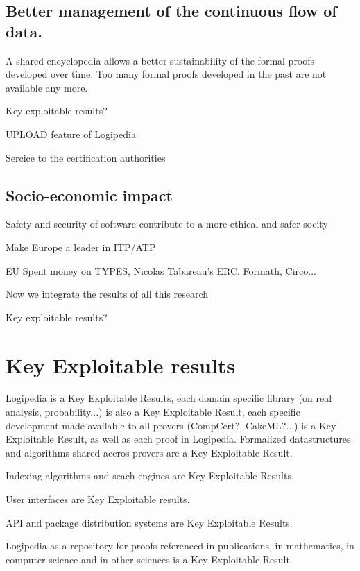 \subsection{Better management of the continuous flow of data.}

A shared encyclopedia allows a better sustainability of the formal
proofs developed over time. Too many formal proofs developed in the
past are not available any more.

{\color{red} Key exploitable results?}

UPLOAD feature of Logipedia

Sercice to the certification authorities

\subsection{Socio-economic impact}

{\color{red} Safety and security of software contribute to a more ethical
  and safer socity}

Make Europe a leader in ITP/ATP

EU Spent money on TYPES, Nicolas Tabareau's ERC. Formath, Circo... 

Now we integrate the results of all this research

{\color{red} Key exploitable results?}


\section{Key Exploitable results}

Logipedia is a Key Exploitable Results, each domain specific library
(on real analysis, probability...) is also a Key Exploitable Result,
each specific development made available to all provers (CompCert?,
CakeML?...) is a Key Exploitable Result, as well as each proof in
Logipedia. Formalized datastructures and algorithms shared accros
provers are a Key Exploitable Result.

Indexing algorithms and seach engines are Key Exploitable Results.

User interfaces are Key Exploitable results.

API and package distribution systems are Key Exploitable Results.

Logipedia as a repository for proofs referenced in publications, 
in mathematics, in computer science and in other sciences is a
Key Exploitable Result.









